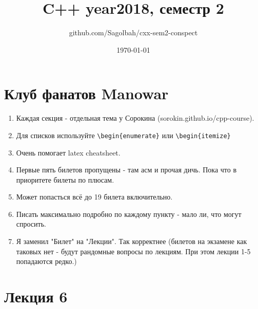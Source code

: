 \documentclass[15pt, a4paper]{article}
\title{C++ year2018, семестр 2}
\author{github.com/Sagolbah/cxx-sem2-conspect}
\date{\today}
\begin{document}
	\section{Клуб фанатов Manowar}
	\begin{enumerate}
		\item Каждая секция - отдельная тема у Сорокина (sorokin.github.io/cpp-course).
		\item Для списков используйте \verb|\begin{enumerate}| или \verb|\begin{itemize}| 
		\item Очень помогает latex cheatsheet.
        \item Первые пять билетов пропущены - там асм и прочая дичь. Пока что в приоритете билеты по плюсам.
        \item Может попасться всё до 19 билета включительно.
        \item Писать максимально подробно по каждому пункту - мало ли, что могут спросить.
        \item Я заменил "Билет" на "Лекции". Так корректнее (билетов на экзамене как таковых нет - будут рандомные вопросы по лекциям. При этом лекции 1-5 попадаются редко.)
    \end{enumerate}
 
    \section{Лекция 6}
\end{document}
